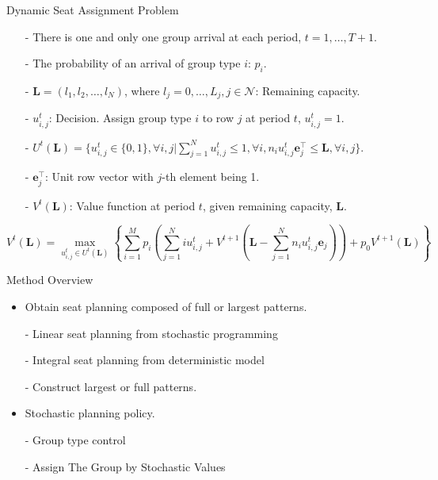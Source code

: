   \begin{frame}{Dynamic Seat Assignment Problem}
    \centering
    \small
    \begin{itemize}
    \item[-] There is one and only one group arrival at each period, $t = 1, \ldots, T+1$. 
    \item[-] The probability of an arrival of group type $i$: $p_i$.  
    \item[-] $\mathbf{L} = (l_1, l_2, \ldots, l_{N})$, where $l_j =0,\ldots, L_j, j\in \mathcal{N}$: Remaining capacity.
    \item[-] $u_{i,j}^{t}$: Decision. Assign group type $i$ to row $j$ at period $t$, $u_{i,j}^t =1$.
    \item[-] $U^{t}(\mathbf{L}) = \{u_{i,j}^{t} \in\{0,1\}, \forall i,j| \sum_{j=1}^{N} u_{i,j}^{t} \leq 1, \forall i, n_{i}u_{i,j}^{t}\mathbf{e}_j^{\top} \leq \mathbf{L}, \forall i,j \}$.
    \item[-] $\mathbf{e}_j^{\top}$: Unit row vector with $j$-th element being 1.
    \item[-] $V^{t}(\mathbf{L})$: Value function at period $t$, given remaining capacity, $\mathbf{L}$.
    \end{itemize}

    $$V^{t}(\mathbf{L}) = \max_{u_{i,j}^{t} \in U^{t}(\mathbf{L})}\left\{ \sum_{i=1}^{M} p_i ( \sum_{j=1}^{N} i u_{i,j}^{t} + V^{t+1}(\mathbf{L}- \sum_{j=1}^{N} n_i u_{i,j}^{t}\mathbf{e}_j)) + p_0 V^{t+1}(\mathbf{L})\right\}$$
    \small

\end{frame}

\begin{frame}{Method Overview}
  \begin{itemize}
    \item Obtain seat planning composed of full or largest patterns.
    
    - Linear seat planning from stochastic programming
    
    - Integral seat planning from deterministic model

    - Construct largest or full patterns.

    \item Stochastic planning policy.

    - Group type control

    - Assign The Group by Stochastic Values

  \end{itemize}
\end{frame}
